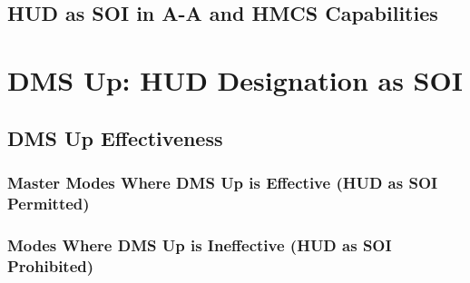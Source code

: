 \documentclass[11pt, a4paper, twoside]{report}
\begin{document}
\subsection{HUD as SOI in A-A and HMCS Capabilities}
\label{sec:C3-S1-S3}

\section{DMS Up: HUD Designation as SOI}
\label{sec:C3-S2}

\subsection{DMS Up Effectiveness}
\label{sec:C3-S2-S1}

\subsubsection{Master Modes Where DMS Up is Effective (HUD as SOI Permitted)}
\label{sec:C3-S2-S1-S1}

\subsubsection{Modes Where DMS Up is Ineffective (HUD as SOI Prohibited)}
\label{sec:C3-S2-S1-S2}

\end{document}
